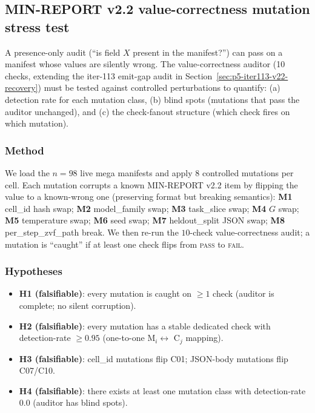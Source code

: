 \subsection{MIN-REPORT v2.2 value-correctness mutation stress test}
\label{sec:p5-iter121-value-correctness}

A presence-only audit (``is field $X$ present in the manifest?'') can pass
on a manifest whose values are silently wrong. The value-correctness
auditor (10 checks, extending the iter-113 emit-gap audit in
Section~\ref{sec:p5-iter113-v22-recovery}) must be tested against
controlled perturbations to quantify: (a) detection rate for each
mutation class, (b) blind spots (mutations that pass the auditor
unchanged), and (c) the check-fanout structure (which check fires on
which mutation).

\subsubsection{Method}
We load the $n{=}98$ live mega manifests and apply $8$ controlled
mutations per cell. Each mutation corrupts a known MIN-REPORT v2.2 item
by flipping the value to a known-wrong one (preserving format but
breaking semantics): \textbf{M1} cell\_id hash swap; \textbf{M2}
model\_family swap; \textbf{M3} task\_slice swap;
\textbf{M4} $G$ swap; \textbf{M5} temperature swap;
\textbf{M6} seed swap; \textbf{M7} heldout\_split JSON swap;
\textbf{M8} per\_step\_zvf\_path break. We then re-run the
$10$-check value-correctness audit; a mutation is ``caught'' if at
least one check flips from \textsc{pass} to \textsc{fail}.

\subsubsection{Hypotheses}
\begin{itemize}
  \item \textbf{H1 (falsifiable)}: every mutation is caught on $\geq 1$
        check (auditor is complete; no silent corruption).
  \item \textbf{H2 (falsifiable)}: every mutation has a stable dedicated
        check with detection-rate $\geq 0.95$ (one-to-one
        M$_i \leftrightarrow$ C$_j$ mapping).
  \item \textbf{H3 (falsifiable)}: cell\_id mutations flip C01; JSON-body
        mutations flip C07/C10.
  \item \textbf{H4 (falsifiable)}: there exists at least one mutation
        class with detection-rate $0.0$ (auditor has blind spots).
\end{itemize}


